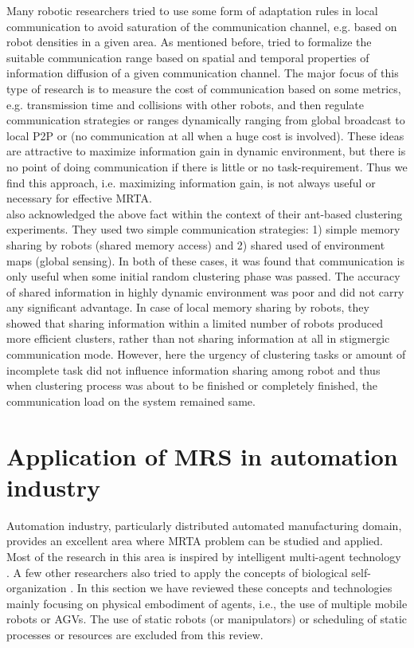 Many robotic researchers tried to use some form of adaptation rules in local communication to avoid saturation of the communication channel, e.g. based on robot densities in a given area.  As mentioned before,   tried to formalize the suitable communication range based on spatial and temporal properties of information diffusion of a given communication channel. The major focus of this type of research is to measure the cost of communication based on some metrics, e.g.  transmission time and collisions with other robots, and then regulate communication strategies or ranges dynamically ranging from global broadcast to local P2P or (no communication at all when a huge cost is involved). These ideas are attractive to maximize information gain in dynamic environment, but there is no point of doing communication if there is little or no task-requirement. Thus we find this approach, i.e. maximizing information gain,  is not always useful or necessary for effective MRTA.\\
\cite{Oca+2005} also acknowledged the above fact within the context of their ant-based clustering experiments. They used two simple communication strategies: 1) simple memory sharing by robots (shared memory access) and 2) shared used of environment maps (global sensing). In both of these cases, it was found that communication is only useful when some initial random clustering phase was passed. The accuracy of shared information in highly dynamic environment was poor and did not carry any significant advantage. In case of local memory sharing by robots, they showed that  sharing information within a limited number of robots produced more efficient  clusters, rather than  not sharing information at all in stigmergic communication mode. However, here the urgency of clustering tasks or amount of incomplete task did not influence information sharing among robot and thus when clustering process was about to be finished or completely finished, the communication load on the system remained same.
\section{Application of MRS in automation industry}
\label{bg:mrs-industry}
Automation industry, particularly distributed automated manufacturing domain, provides an excellent area where MRTA problem can be studied and applied. Most of the research in this area is inspired by intelligent multi-agent technology \cite{Shen+2001}. A few other researchers also tried to apply the concepts of biological self-organization \cite{Ueda2006,Lazinica+2007}. In this section we have reviewed these concepts and technologies mainly focusing on physical embodiment of agents, i.e., the use of multiple mobile robots or  AGVs. The use of static robots (or manipulators) or scheduling of static processes or resources are excluded from this review.
%

